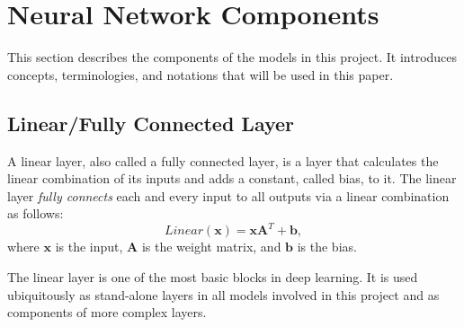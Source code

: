 \documentclass{l4proj}
\begin{document}

\section{Neural Network Components}
This section describes the components of the models in this project. It introduces concepts, terminologies, and notations that will be used in this paper.

\subsection{Linear/Fully Connected Layer}
A linear layer, also called a fully connected layer, is a layer that calculates the linear combination of its inputs and adds a constant, called bias, to it. The linear layer \emph{fully connects} each and every input to all outputs via a linear combination as follows:
\begin{equation}
    Linear(\boldsymbol{x}) = \boldsymbol{x} \boldsymbol{A}^T + \boldsymbol{b},
\end{equation}
where $\boldsymbol{x}$ is the input, $\boldsymbol{A}$ is the weight matrix, and $\boldsymbol{b}$ is the bias.

The linear layer is one of the most basic blocks in deep learning. It is used ubiquitously as stand-alone layers in all models involved in this project and as components of more complex layers.
\end{document}
